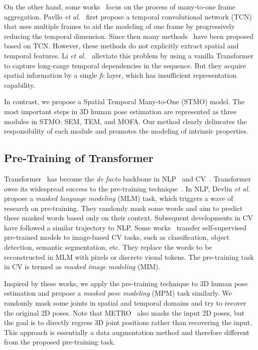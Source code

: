 \documentclass[]{llncs}
\begin{document}
On the other hand, some works~\cite{pavllo20193d,liu2020attention,chen2021anatomy} focus on the process of many-to-one frame aggregation. Pavllo \textit{et al.}~\cite{pavllo20193d} first propose a temporal convolutional network (TCN) that uses multiple frames to aid the modeling of one frame by progressively reducing the temporal dimension. Since then many methods~\cite{zeng2020srnet,chen2021anatomy,shan2021improving,liu2020attention} have been proposed based on TCN. However, these methods do not explicitly extract spatial and temporal features. Li \textit{et al.}~\cite{li2022exploiting} alleviate this problem by using a vanilla Transformer to capture long-range temporal dependencies in the sequence. But they acquire spatial information by a single \emph{fc} layer, which has insufficient representation capability.

In contrast, we propose a Spatial Temporal Many-to-One (STMO) model. The most important steps in 3D human pose estimation are represented as three modules in STMO: SEM, TEM, and MOFA. Our method clearly delineates the responsibility of each module and promotes the modeling of intrinsic properties.

\subsection{Pre-Training of Transformer}
Transformer~\cite{vaswani2017attention} has become the \emph{de facto} backbone in NLP~\cite{devlin2018bert,brown2020language,radford2019language,conneau2019cross,qiu2020pre} and CV~\cite{carion2020end,dosovitskiy2021an,touvron2021training,han2020survey,chen2021empirical}. Transformer owes its widespread success to the pre-training technique~\cite{yosinski2014transferable,Peters2018DeepCW,devlin2018bert,bao2022beit,yan2022crossloc}. In NLP, Devlin \textit{et al.}~\cite{devlin2018bert} propose a \emph{masked language modeling} (MLM) task, which triggers a wave of research on pre-training. They randomly mask some words and aim to predict these masked words based only on their context. Subsequent developments in CV have followed a similar trajectory to NLP. Some works~\cite{dosovitskiy2021an,he2022masked,bao2022beit} transfer self-supervised pre-trained models to image-based CV tasks, such as classification, object detection, semantic segmentation, etc. They replace the words to be reconstructed in MLM with pixels or discrete visual tokens. The pre-training task in CV is termed as \emph{masked image modeling} (MIM). 

Inspired by these works, we apply the pre-training technique to 3D human pose estimation and propose a \emph{masked pose modeling} (MPM) task similarly. We randomly mask some joints in spatial and temporal domains and try to recover the original 2D poses. Note that METRO~\cite{lin2021end} also masks the input 2D poses, but the goal is to directly regress 3D joint positions rather than recovering the input. This approach is essentially a data augmentation method and therefore different from the proposed pre-training task.
\end{document}
